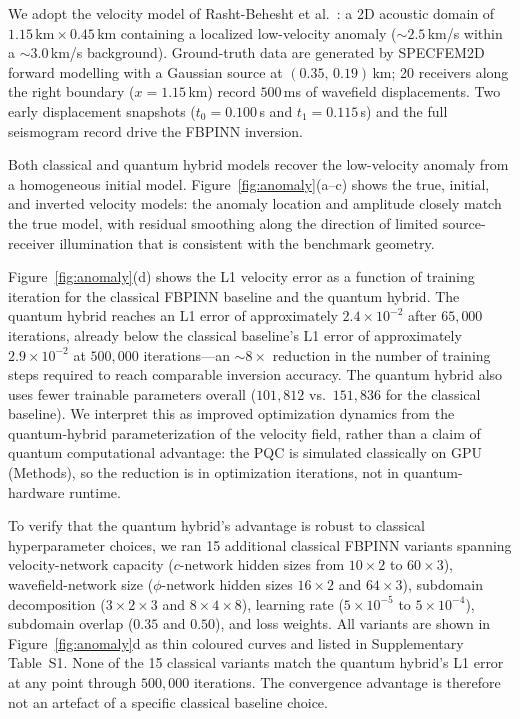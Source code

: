 We adopt the velocity model of Rasht-Behesht et al.~\cite{rahst}: a 2D acoustic domain of $1.15$\,km\,$\times$\,$0.45$\,km containing a localized low-velocity anomaly ($\sim$$2.5$\,km/s within a $\sim$$3.0$\,km/s background). Ground-truth data are generated by SPECFEM2D~ forward modelling with a Gaussian source at $(0.35,\,0.19)$\,km; 20 receivers along the right boundary ($x = 1.15$\,km) record $500$\,ms of wavefield displacements. Two early displacement snapshots ($t_0 = 0.100$\,s and $t_1 = 0.115$\,s) and the full seismogram record drive the FBPINN inversion.

Both classical and quantum hybrid models recover the low-velocity anomaly from a homogeneous initial model. Figure~\ref{fig:anomaly}(a--c) shows the true, initial, and inverted velocity models: the anomaly location and amplitude closely match the true model, with residual smoothing along the direction of limited source-receiver illumination that is consistent with the benchmark geometry.

Figure~\ref{fig:anomaly}(d) shows the L1 velocity error as a function of training iteration for the classical FBPINN baseline and the quantum hybrid. The quantum hybrid reaches an L1 error of approximately $2.4\times 10^{-2}$ after $65{,}000$ iterations, already below the classical baseline's L1 error of approximately $2.9\times 10^{-2}$ at $500{,}000$ iterations---an $\sim$$8\times$ reduction in the number of training steps required to reach comparable inversion accuracy. The quantum hybrid also uses fewer trainable parameters overall ($101{,}812$ vs.\ $151{,}836$ for the classical baseline). We interpret this as improved optimization dynamics from the quantum-hybrid parameterization of the velocity field, rather than a claim of quantum computational advantage: the PQC is simulated classically on GPU (Methods), so the reduction is in optimization iterations, not in quantum-hardware runtime.

To verify that the quantum hybrid's advantage is robust to classical hyperparameter choices, we ran 15 additional classical FBPINN variants spanning velocity-network capacity ($c$-network hidden sizes from $10\!\times\!2$ to $60\!\times\!3$), wavefield-network size ($\phi$-network hidden sizes $16\!\times\!2$ and $64\!\times\!3$), subdomain decomposition ($3\!\times\!2\!\times\!3$ and $8\!\times\!4\!\times\!8$), learning rate ($5\!\times\!10^{-5}$ to $5\!\times\!10^{-4}$), subdomain overlap ($0.35$ and $0.50$), and loss weights. All variants are shown in Figure~\ref{fig:anomaly}d as thin coloured curves and listed in Supplementary Table~S1. None of the 15 classical variants match the quantum hybrid's L1 error at any point through $500{,}000$ iterations. The convergence advantage is therefore not an artefact of a specific classical baseline choice.

